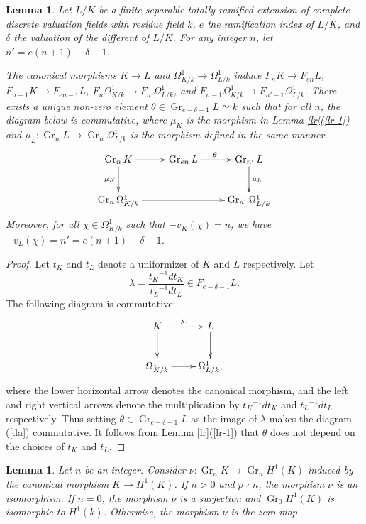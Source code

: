 \documentclass[10pt,a4paper]{amsart}
\numberwithin{equation}{section}
\newcommand{\Gr}{\operatorname{Gr}}
\theoremstyle{plain}
\newtheorem{lemm}[theo]{Lemma}
\theoremstyle{definition}
\begin{document}
\begin{lemm}\label{lg}
  Let $L/K$ be a finite separable totally ramified extension of complete discrete valuation fields with residue field $k$, $e$ the ramification index of $L/K$,  and $\delta$ the valuation of the different of $L/K$. For any integer $n$, let $n'=e(n+1)-\delta-1$. 

  The canonical morphisms $K\to L$ and $\Omega_{K/k}^1\to\Omega_{L/k}^1$ induce $F_nK\to F_{en}L$, $F_{n-1}K\to F_{en-1}L$, $F_n\Omega_{K/k}^1\to F_{n'}\Omega_{L/k}^1$, and $F_{n-1}\Omega_{K/k}^1\to F_{n'-1}\Omega_{L/k}^1$. There exists a unique non-zero element $\theta\in\Gr_{e-\delta-1}L\simeq k$ such that for all $n$, the diagram below is commutative, where $\mu_{K}$ is the morphism in Lemma \ref{lr}(\ref{lr-1}) and $\mu_{L}:\Gr_nL\to\Gr_n\Omega_{L/k}^1$ is the morphism defined in the same manner.
    \begin{equation}\label{da}
    \xymatrix{
      \Gr_nK\ar[r]\ar[d]_{\mu_{K}}&\Gr_{en}L\ar[r]^{\theta\cdot}&\Gr_{n'}L\ar[d]^{\mu_{L}}\\
      \Gr_n\Omega_{K/k}^1\ar[rr]&&\Gr_{n'}\Omega_{L/k}^1
    }
    \end{equation}
    Moreover, for all $\chi\in\Omega_{K/k}^1$ such that $-v_K(\chi)=n$, we have $-v_L(\chi)=n'=e(n+1)-\delta-1$. 
\end{lemm}

\begin{proof}
  Let $t_K$ and $t_L$ denote a uniformizer of $K$ and $L$ respectively. Let
  \begin{equation}
    \lambda=\frac{{t_K}^{-1}dt_K}{{t_L}^{-1}dt_L}\in F_{e-\delta-1}L.
  \end{equation}
  The following diagram is commutative:
  \begin{equation}
  \xymatrix{
    K\ar[r]^{\lambda\cdot}\ar[d]&L\ar[d]\\
    \Omega_{K/k}^1\ar[r]&\Omega_{L/k}^1,
    }
  \end{equation}
  where the lower horizontal arrow denotes the canonical morphism, and the left and right vertical arrows denote the multiplication by ${t_K}^{-1}dt_K$ and ${t_L}^{-1}dt_L$ respectively. Thus setting $\theta\in\Gr_{e-\delta-1}L$ as the image of $\lambda$ makes the diagram (\ref{da}) commutative. It follows from Lemma \ref{lr}(\ref{lr-1}) that $\theta$ does not depend on the choices of $t_K$ and $t_L$.
  \end{proof}



 \begin{lemm}\label{le}
 Let $n$ be an integer. Consider $\nu:\Gr_nK\to\Gr_nH^1(K)$ induced by the canonical morphism $K\to H^1(K)$. If $n>0$ and $p\nmid n$, the morphism $\nu$ is an isomorphism. If $n=0$, the morphism $\nu$ is a surjection and $\Gr_0H^1(K)$ is isomorphic to $H^1(k)$. Otherwise, the morphism $\nu$ is the zero-map. 
\end{lemm}
\end{document}
